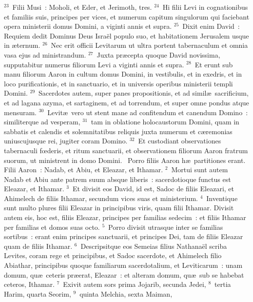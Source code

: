 ${}^{23}$~Filii Musi~: Moholi, et Eder, et Jerimoth, tres.
${}^{24}$~Hi filii Levi in cognationibus et familiis suis, principes per vices, et numerum capitum singulorum qui faciebant opera ministerii domus Domini, a viginti annis et supra.
${}^{25}$~Dixit enim David~: Requiem dedit Dominus Deus Isra\"el populo suo, et habitationem Jerusalem usque in \ae ternum.
${}^{26}$~Nec erit officii Levitarum ut ultra portent tabernaculum et omnia vasa ejus ad ministrandum.
${}^{27}$~Juxta pr\ae cepta quoque David novissima, supputabitur numerus filiorum Levi a viginti annis et supra.
${}^{28}$~Et erunt sub manu filiorum Aaron in cultum domus Domini, in vestibulis, et in exedris, et in loco purificationis, et in sanctuario, et in universis operibus ministerii templi Domini.
${}^{29}$~Sacerdotes autem, super panes propositionis, et ad simil\ae\ sacrificium, et ad lagana azyma, et sartaginem, et ad torrendum, et super omne pondus atque mensuram.
${}^{30}$~Levit\ae\ vero ut stent mane ad confitendum et canendum Domino~: similiterque ad vesperam,
${}^{31}$~tam in oblatione holocaustorum Domini, quam in sabbatis et calendis et solemnitatibus reliquis juxta numerum et c\ae remonias uniuscujusque rei, jugiter coram Domino.
${}^{32}$~Et custodiant observationes tabernaculi fœderis, et ritum sanctuarii, et observationem filiorum Aaron fratrum suorum, ut ministrent in domo Domini.
~Porro filiis Aaron h\ae\ partitiones erant. Filii Aaron~: Nadab, et Abiu, et Eleazar, et Ithamar.
${}^{2}$~Mortui sunt autem Nadab et Abiu ante patrem suum absque liberis~: sacerdotioque functus est Eleazar, et Ithamar.
${}^{3}$~Et divisit eos David, id est, Sadoc de filiis Eleazari, et Ahimelech de filiis Ithamar, secundum vices suas et ministerium.
${}^{4}$~Inventique sunt multo plures filii Eleazar in principibus viris, quam filii Ithamar. Divisit autem eis, hoc est, filiis Eleazar, principes per familias sedecim~: et filiis Ithamar per familias et domos suas octo.
${}^{5}$~Porro divisit utrasque inter se familias sortibus~: erant enim principes sanctuarii, et principes Dei, tam de filiis Eleazar quam de filiis Ithamar.
${}^{6}$~Descripsitque eos Semeias filius Nathana\"el scriba Levites, coram rege et principibus, et Sadoc sacerdote, et Ahimelech filio Abiathar, principibus quoque familiarum sacerdotalium, et Leviticarum~: unam domum, qu\ae\ ceteris pr\ae erat, Eleazar~: et alteram domum, qu\ae\ sub se habebat ceteros, Ithamar.
${}^{7}$~Exivit autem sors prima Jojarib, secunda Jedei,
${}^{8}$~tertia Harim, quarta Seorim,
${}^{9}$~quinta Melchia, sexta Maiman,
